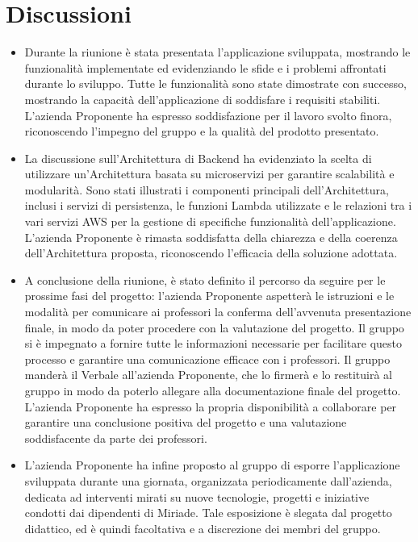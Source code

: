 \documentclass[a4paper,12pt]{article}
\newcommand{\ignoreglossary}{}
\begin{document}
\section{Discussioni}
\begin{itemize}
    \item Durante la riunione è stata presentata l'applicazione sviluppata, mostrando le funzionalità implementate ed evidenziando le sfide e i problemi affrontati durante lo sviluppo. Tutte le funzionalità sono state dimostrate con successo, mostrando la capacità dell'applicazione di soddisfare i requisiti stabiliti. L'azienda Proponente ha espresso soddisfazione per il lavoro svolto finora, riconoscendo l'impegno del gruppo e la qualità del prodotto presentato.
    \item La discussione sull'Architettura di Backend ha evidenziato la scelta di utilizzare un'Architettura basata su microservizi per garantire scalabilità e modularità. Sono stati illustrati i componenti principali dell'Architettura, inclusi i servizi di persistenza, le funzioni Lambda utilizzate e le relazioni tra i vari servizi AWS per la gestione di specifiche funzionalità dell'applicazione. L'azienda Proponente è rimasta soddisfatta della chiarezza e della coerenza dell'Architettura proposta, riconoscendo l'efficacia della soluzione adottata.
    \item A conclusione della riunione, è stato definito il percorso da seguire per le prossime fasi del progetto: l'azienda Proponente aspetterà le istruzioni e le modalità per comunicare ai professori la conferma dell'avvenuta presentazione finale, in modo da poter procedere con la valutazione del progetto. Il gruppo si è impegnato a fornire tutte le informazioni necessarie per facilitare questo \ignoreglossary{processo} e garantire una comunicazione efficace con i professori. Il gruppo manderà il Verbale all'azienda Proponente, che lo firmerà e lo restituirà al gruppo in modo da poterlo allegare alla documentazione finale del progetto. L'azienda Proponente ha espresso la propria disponibilità a collaborare per garantire una conclusione positiva del progetto e una valutazione soddisfacente da parte dei professori.
    \item L'azienda Proponente ha infine proposto al gruppo di esporre l'applicazione sviluppata durante una giornata, organizzata periodicamente dall'azienda, dedicata ad interventi mirati su nuove tecnologie, progetti e iniziative condotti dai dipendenti di Miriade. Tale esposizione è slegata dal progetto didattico, ed è quindi facoltativa e a discrezione dei membri del gruppo.
\end{itemize}   
\end{document}
